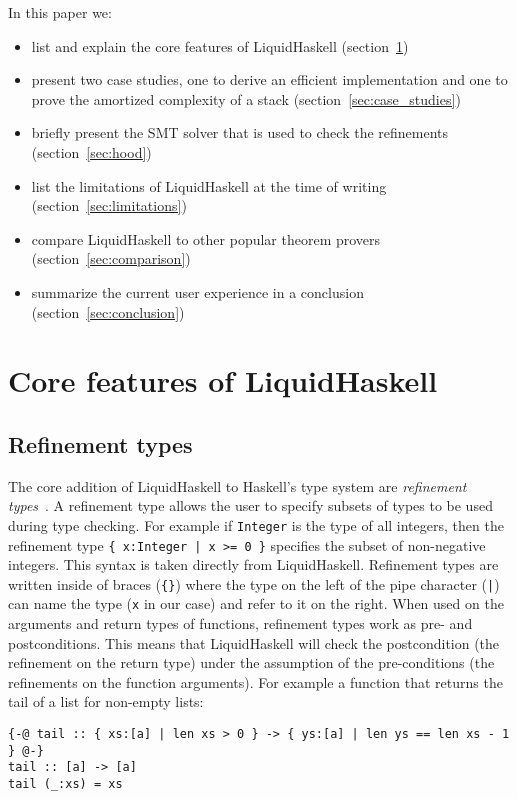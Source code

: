 \documentclass[acmlarge,screen,authorversion=true,nonacm=true]{acmart}
\begin{document}
In this paper we:
\begin{itemize}
\item{list and explain the core features of LiquidHaskell (section~\ref{sec:features})}
\item{present two case studies, one to derive an efficient implementation and one to prove the amortized complexity of a stack (section~\ref{sec:case_studies})}
\item{briefly present the SMT solver that is used to check the refinements (section~\ref{sec:hood})}
\item{list the limitations of LiquidHaskell at the time of writing (section~\ref{sec:limitations})}
\item{compare LiquidHaskell to other popular theorem provers (section~\ref{sec:comparison})}
\item{summarize the current user experience in a conclusion (section~\ref{sec:conclusion})}
\end{itemize}

\section{Core features of LiquidHaskell}\label{sec:features}

\subsection{Refinement types}\label{sec:refinement_types}

The core addition of LiquidHaskell to Haskell's type system are \textit{refinement types}~\cite{refinement_types}. A refinement type allows the user to specify subsets of types to be used during type checking. For example if \texttt{Integer} is the type of all integers, then the refinement type \texttt{\{ x:Integer | x >= 0 \}} specifies the subset of non-negative integers. This syntax is taken directly from LiquidHaskell. Refinement types are written inside of braces (\texttt{\{\}}) where the type on the left of the pipe character (\texttt{|}) can name the type (\texttt{x} in our case) and refer to it on the right. When used on the arguments and return types of functions, refinement types work as pre- and postconditions. This means that LiquidHaskell will check the postcondition (the refinement on the return type) under the assumption of the pre-conditions (the refinements on the function arguments). For example a function that returns the tail of a list for non-empty lists:

\begin{lstlisting}
{-@ tail :: { xs:[a] | len xs > 0 } -> { ys:[a] | len ys == len xs - 1 } @-}
tail :: [a] -> [a]
tail (_:xs) = xs
\end{lstlisting}
\end{document}
